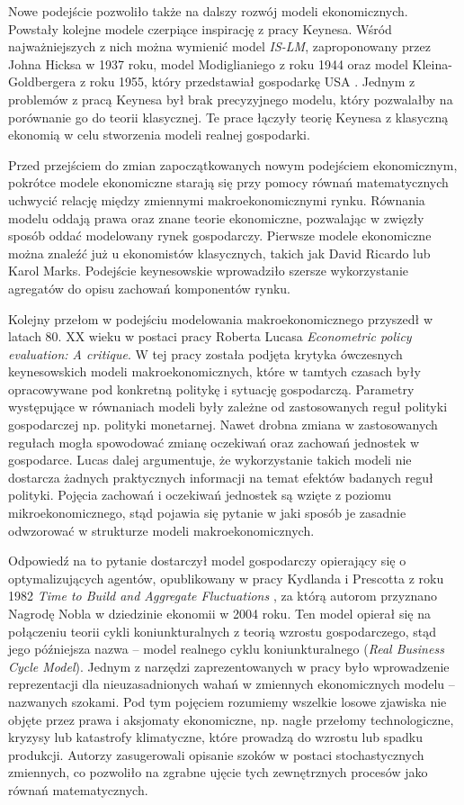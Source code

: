 Nowe podejście pozwoliło także na dalszy rozwój modeli ekonomicznych. Powstały kolejne modele czerpiące inspirację z pracy Keynesa. Wśród najważniejszych z nich można wymienić model \emph{IS-LM}, zaproponowany przez Johna Hicksa w 1937 roku, model Modiglianiego z roku 1944 oraz model Kleina-Goldbergera z roku 1955, który przedstawiał gospodarkę USA \cite{deVroey}. Jednym z problemów z pracą Keynesa był brak precyzyjnego modelu, który pozwalałby na porównanie go do teorii klasycznej. Te prace łączyły teorię Keynesa z klasyczną ekonomią w celu stworzenia modeli realnej gospodarki. 

Przed przejściem do zmian zapoczątkowanych nowym podejściem ekonomicznym, pokrótce modele ekonomiczne starają się przy pomocy równań matematycznych uchwycić relację między zmiennymi makroekonomicznymi rynku. Równania modelu oddają prawa oraz znane teorie ekonomiczne, pozwalając w zwięzły sposób oddać modelowany rynek gospodarczy. Pierwsze modele ekonomiczne można znaleźć już u ekonomistów klasycznych, takich jak David Ricardo lub Karol Marks. Podejście keynesowskie wprowadziło szersze wykorzystanie agregatów do opisu zachowań komponentów rynku.

Kolejny przełom w podejściu modelowania makroekonomicznego przyszedł w latach 80. XX wieku w postaci pracy Roberta Lucasa \emph{Econometric policy evaluation: A critique}\cite{LUCAS197619}. W tej pracy została podjęta krytyka ówczesnych keynesowskich modeli makroekonomicznych, które w tamtych czasach były opracowywane pod konkretną politykę i sytuację gospodarczą. Parametry występujące w równaniach modeli były zależne od zastosowanych reguł polityki gospodarczej np. polityki monetarnej. Nawet drobna zmiana w zastosowanych regułach mogła spowodować zmianę oczekiwań oraz zachowań jednostek w gospodarce. Lucas dalej argumentuje, że wykorzystanie takich modeli nie dostarcza żadnych praktycznych informacji na temat efektów badanych reguł polityki. Pojęcia zachowań i oczekiwań jednostek są wzięte z poziomu mikroekonomicznego, stąd pojawia się pytanie w jaki sposób je zasadnie odwzorować w strukturze modeli makroekonomicznych.

Odpowiedź na to pytanie dostarczył model gospodarczy opierający się o optymalizujących agentów, opublikowany w pracy Kydlanda i Prescotta z roku 1982 \emph{Time to Build and Aggregate Fluctuations} \cite{prescott_kydland}, za którą autorom przyznano Nagrodę Nobla w dziedzinie ekonomii w 2004 roku. Ten model opierał się na połączeniu teorii cykli koniunkturalnych z teorią wzrostu gospodarczego, stąd jego późniejsza nazwa -- model realnego cyklu koniunkturalnego (\emph{Real Business Cycle Model}). Jednym z narzędzi zaprezentowanych w pracy było wprowadzenie reprezentacji dla nieuzasadnionych wahań w zmiennych ekonomicznych modelu -- nazwanych szokami. Pod tym pojęciem rozumiemy wszelkie losowe zjawiska nie objęte przez prawa i aksjomaty ekonomiczne, np. nagłe przełomy technologiczne, kryzysy lub  katastrofy klimatyczne, które prowadzą do wzrostu lub spadku produkcji. Autorzy zasugerowali opisanie szoków w postaci stochastycznych zmiennych, co pozwoliło na zgrabne ujęcie tych zewnętrznych procesów jako równań matematycznych. 

